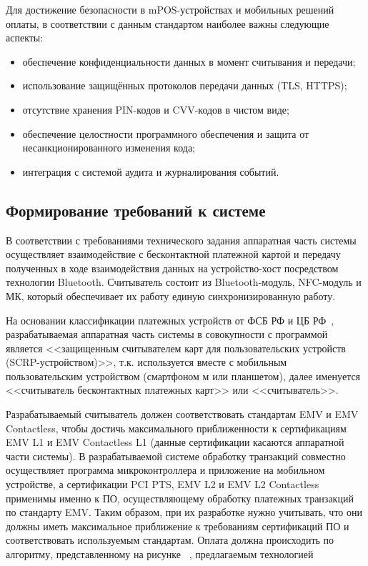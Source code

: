Для достижение безопасности в mPOS-устройствах и мобильных решений оплаты, в соответствии с данным стандартом наиболее важны следующие аспекты:

\begin{itemize}
    \item обеспечение конфиденциальности данных в момент считывания и передачи;
    \item использование защищённых протоколов передачи данных (TLS, HTTPS);
    \item отсутствие хранения PIN-кодов и CVV-кодов в чистом виде;
    \item обеспечение целостности программного обеспечения и защита от несанкционированного изменения кода;
    \item интеграция с системой аудита и журналирования событий.
\end{itemize}


\subsection{Формирование требований к системе}

В соответствии с требованиями технического задания аппаратная часть системы осуществляет взаимодействие с бесконтактной платежной картой и передачу полученных в ходе взаимодействия данных на устройство-хост посредством технологии Bluetooth.
Считыватель состоит из Bluetooth-модуль, NFC-модуль и МК, который обеспечивает их работу единую синхронизированную работу.

На основании классификации платежных устройств от ФСБ РФ и ЦБ РФ~\cite{cbr_requirements}, разрабатываемая аппаратная часть системы в совокупности с программой является <<защищенным считывателем карт для пользовательских устройств (SCRP-устройством)>>, т.к. используется вместе с мобильным пользовательским устройством (смартфоном м или планшетом), далее именуется <<считыватель бесконтактных платежных карт>> или <<считыватель>>.

Разрабатываемый считыватель должен соответствовать стандартам EMV и EMV Contactless, чтобы достичь максимального приближенности к сертификациям EMV L1 и EMV Contactless L1 (данные сертификации касаются аппаратной части системы).
В разрабатываемой системе обработку транзакций совместно осуществляет программа микроконтроллера и приложение на мобильном устройстве, а сертификации PCI PTS, EMV L2 и EMV L2 Contactless применимы именно к ПО, осуществляющему обработку платежных транзакций по стандарту EMV.
Таким образом, при их разработке нужно учитывать, что они должны иметь максимальное приближение к требованиям сертификаций ПО и соответствовать используемым стандартам.
Оплата должна происходить по алгоритму, представленному на рисунке~ %
, предлагаемым технологией %

